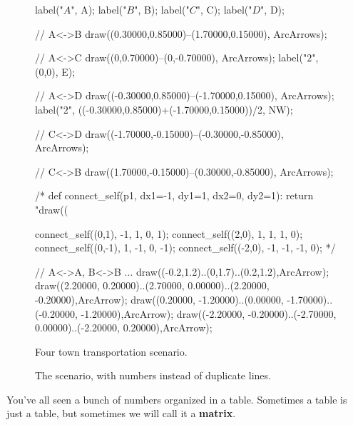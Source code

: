 \documentclass[../gatm.tex]{subfiles}
\begin{document}
\begin{figure}[h]
\begin{center}
\begin{minipage}[b]{0.45\textwidth}
\begin{asy}[width=0.7\textwidth]
				label("$A$", A);
				label("$B$", B);
				label("$C$", C);
				label("$D$", D);
				
				// A<->B
				draw((0.30000,0.85000)--(1.70000,0.15000), ArcArrows);
				
				// A<->C
				draw((0,0.70000)--(0,-0.70000), ArcArrows);
				label("$2$", (0,0), E);
				
				// A<->D
				draw((-0.30000,0.85000)--(-1.70000,0.15000), ArcArrows);
				label("$2$", ((-0.30000,0.85000)+(-1.70000,0.15000))/2, NW);
				
				// C<->D
				draw((-1.70000,-0.15000)--(-0.30000,-0.85000), ArcArrows);
				
				// C<->B
				draw((1.70000,-0.15000)--(0.30000,-0.85000), ArcArrows);
				
				/*
				def connect_self(p1, dx1=-1, dy1=1, dx2=0, dy2=1):
					return "draw((%
				
				connect_self((0,1), -1, 1, 0, 1);
				connect_self((2,0), 1, 1, 1, 0);
				connect_self((0,-1), 1, -1, 0, -1);
				connect_self((-2,0), -1, -1, -1, 0);
				*/
				
				// A<->A, B<->B ...
				draw((-0.2,1.2)..(0,1.7)..(0.2,1.2),ArcArrow);
				draw((2.20000, 0.20000)..(2.70000, 0.00000)..(2.20000, -0.20000),ArcArrow);
				draw((0.20000, -1.20000)..(0.00000, -1.70000)..(-0.20000, -1.20000),ArcArrow);
				draw((-2.20000, -0.20000)..(-2.70000, 0.00000)..(-2.20000, 0.20000),ArcArrow);
			\end{asy}
		\end{minipage}
	\end{center}
	\vspace*{-2\baselineskip}
	\begin{center}
		\begin{minipage}[t]{0.45\textwidth}
			\caption{Four town transportation scenario.}
			\label{fig:four_town_scenario}
		\end{minipage}
		\hfill
		\begin{minipage}[t]{0.45\textwidth}
			\caption{The scenario, with numbers instead of duplicate lines.}
			\label{fig:scenario_with_nums}
		\end{minipage}
	\end{center}
\end{figure}

\noindent You've all seen a bunch of numbers organized in a table. Sometimes a table is just a table, but sometimes we will call it a \textbf{matrix}.
\end{document}
